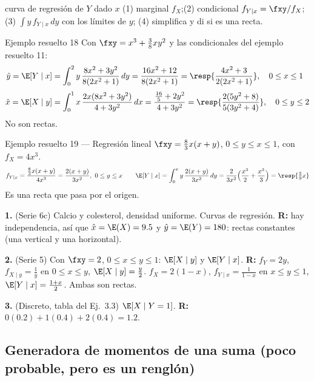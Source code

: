 \begin{receta}{curva de regresi\'on de $Y$ dado $x$}
(1) marginal $f_X$;\quad (2) condicional $f_{Y\mid x}=\fxy/f_X$;\quad (3) $\int y\,f_{Y\mid x}\,dy$ con los l\'imites de $y$;\quad
(4) simplifica y di si es una recta.
\end{receta}

\begin{ejemplo}{Ejemplo resuelto 18 }
Con $\fxy=x^3+\tfrac38xy^2$ y las condicionales del ejemplo resuelto 11:
\begin{align*}
\hat y=\E[Y\mid x]&=\int_0^2y\,\frac{8x^2+3y^2}{8(2x^2+1)}\,dy=\frac{16x^2+12}{8(2x^2+1)}=\resp{\frac{4x^2+3}{2(2x^2+1)}},\quad0\le x\le1\\[3pt]
\hat x=\E[X\mid y]&=\int_0^1x\,\frac{2x(8x^2+3y^2)}{4+3y^2}\,dx=\frac{\frac{16}{5}+2y^2}{4+3y^2}=\resp{\frac{2(5y^2+8)}{5(3y^2+4)}},\quad0\le y\le2
\end{align*}
No son rectas.
\end{ejemplo}

\begin{ejemplo}{Ejemplo resuelto 19 --- Regresi\'on lineal }
$\fxy=\tfrac83x(x+y)$, $0\le y\le x\le1$, con $f_X=4x^3$.
\[
f_{Y\mid x}=\frac{\frac83x(x+y)}{4x^3}=\frac{2(x+y)}{3x^2},\ 0\le y\le x
\qquad
\E[Y\mid x]=\int_0^xy\,\frac{2(x+y)}{3x^2}\,dy=\frac{2}{3x^2}\Big(\frac{x^3}{2}+\frac{x^3}{3}\Big)=\resp{\tfrac59x}
\]
Es una recta que pasa por el origen.
\end{ejemplo}

\begin{mecaniza}
\textbf{1.} (Serie 6c) Calcio y colesterol, densidad uniforme. Curvas de regresi\'on.
\quad\textbf{R:} hay independencia, as\'i que $\hat x=\E(X)=9.5$ y $\hat y=\E(Y)=180$: rectas constantes (una vertical y una horizontal).

\textbf{2.} (Serie 5) Con $\fxy=2$, $0\le x\le y\le1$: $\E[X\mid y]$ y $\E[Y\mid x]$.
\quad\textbf{R:} $f_Y=2y$, $f_{X\mid y}=\tfrac1y$ en $0\le x\le y$, $\E[X\mid y]=\tfrac y2$.
$f_X=2(1-x)$, $f_{Y\mid x}=\tfrac1{1-x}$ en $x\le y\le1$, $\E[Y\mid x]=\tfrac{1+x}2$. Ambas son rectas.

\textbf{3.} (Discreto, tabla del Ej.~3.3) $\E[X\mid Y=1]$.
\quad\textbf{R:} $0(0.2)+1(0.4)+2(0.4)=1.2$.
\end{mecaniza}

\subsection{Generadora de momentos de una suma (poco probable, pero es un rengl\'on)}

